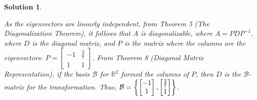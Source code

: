 \documentclass[11pt]{scrartcl}
\theoremstyle{dotlessP}
\newtheorem{sol}{Solution}[section]
\theoremstyle{dotlessN}
\DeclarePairedDelimiter\set{\{}{\}}
\newcommand{\reals}{\mathbb{R}} %
\newcommand{\basis}{\mathcal{B}}
\begin{document}
\begin{sol}
\begin{itemize}
		As the eigenvectors are linearly independent, from Theorem 5 (The Diagonalization Theorem), it follows that $A$ is diagonalizable, where $A = PDP^{-1}$, where $D$ is the diagonal matrix, and $P$ is the matrix where the columns are the eigenvectors:
		$P = \begin{bmatrix}
			-1 & \frac{3}{7} \\
			1 & 1
\end{bmatrix}
$. From Theorem 8 (Diagonal Matrix Representation), if the basis $\basis$ for $\reals^2$ formed the columns of $P$, then  $D$ is the $\basis$-matrix for the transformation. Thus, $\basis = \set*{
\begin{bmatrix}
	-1 \\
	1
\end{bmatrix},
\begin{bmatrix}
	\frac{3}{7} \\
	1
\end{bmatrix}
}$.
	 \end{itemize}
\end{sol}
\end{document}
